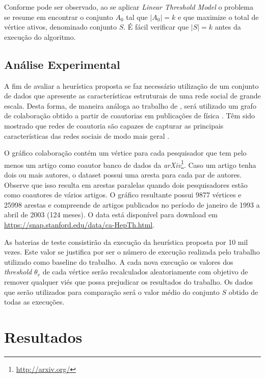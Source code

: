 \documentclass[12pt]{article}
\begin{document}
Conforme pode ser observado, ao se aplicar \textit{Linear Threshold Model} o problema se resume em encontrar o conjunto $A_{0}$  tal que $|A_{0}| = k$ e que maximize o total de vértice ativos, denominado conjunto $S${}. É fácil verificar que $|S| = k$ antes da execução do algoritmo. 

\subsection{Análise Experimental}
\label{subsec:experimentos}

A fim de avaliar a heurística proposta se faz necessário  utilização de um conjunto de dados que apresente as características estruturais de uma rede social de grande escala. Desta forma, de maneira análoga ao trabalho de \cite{kempe2003maximizing}, será utilizado um grafo de colaboração obtido a partir de coautorias em publicações de física \cite{snapnets}. Têm sido mostrado que redes de coautoria são capazes de capturar as principais características das redes sociais de modo mais geral \cite{newman2001structure}.

O gráfico colaboração contém um vértice para cada pesquisador que tem pelo menos um artigo como coautor banco de dados da \textit{arXiv}\footnote{\url{http://arxiv.org/}}. Caso um artigo tenha dois ou mais autores, o dataset  possui uma aresta para cada par de autores. Observe que isso resulta em arestas paralelas quando dois pesquisadores estão como coautores de vários artigos. O gráfico resultante possui 9877 vértices e 25998 arestas e compreende de artigos publicados no período de janeiro de 1993 a abril de 2003 (124 meses). O data está disponível para download em \url{https://snap.stanford.edu/data/ca-HepTh.html}.

As baterias de teste consistirão da execução da heurística proposta por 10 mil vezes. Este valor se justifica por ser o número de execução realizada pelo trabalho utilizado como baseline do trabalho. A cada nova execução os valores dos \textit{threshold} $\theta_v$ de cada vértice serão recalculados aleatoriamente com objetivo de remover qualquer viés que possa prejudicar os resultados do trabalho. Os dados que serão utilizados para comparação será o valor médio do conjunto $S$ obtido de todas as execuções. 





\section{Resultados}
\label{sec:resultados}
\end{document}
